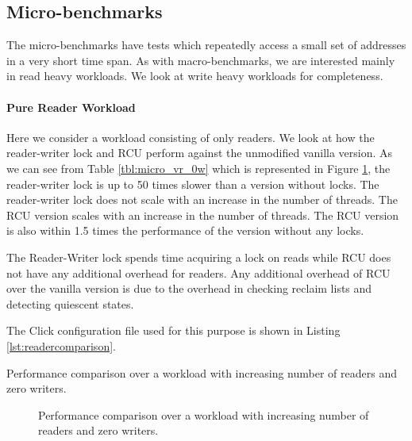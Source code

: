 \documentclass[12pt,a4paper]{article}
\begin{document}
\subsection{Micro-benchmarks}
\label{sec:microbenchmarks}
The micro-benchmarks have tests which repeatedly access a small set of addresses in a very short time span.
As with macro-benchmarks, we are interested mainly in read heavy workloads. We look at write heavy workloads for completeness.

\paragraph{Pure Reader Workload}
Here we consider a workload consisting of only readers. We look at how the reader-writer lock and RCU perform against the unmodified vanilla version.
As we can see from Table \ref{tbl:micro_vr_0w} which is represented in Figure \ref{img:micro_vr_0w}, the reader-writer lock is up to 50 times slower than a version without locks.
The reader-writer lock does not scale with an increase in the number of threads. The RCU version scales with an increase in the number of threads. The RCU version is also within 1.5 times the performance of the version without any locks.

The Reader-Writer lock spends time acquiring a lock on reads while RCU does not have any additional overhead for readers. Any additional overhead of RCU over the vanilla version is due to the overhead in checking reclaim lists and detecting quiescent states.

The Click configuration file used for this purpose is shown in Listing \ref{lst:readercomparison}.
\begin{table}
\begin{center}

\end{center}
\label{tbl:micro_vr_0w}
\caption{Performance comparison over a workload with increasing number of readers and zero writers.}
\end{table}

\begin{figure}[tph]
\caption{Performance comparison over a workload with increasing number of readers and zero writers.}
\label{img:micro_vr_0w}
\end{figure}
\end{document}
